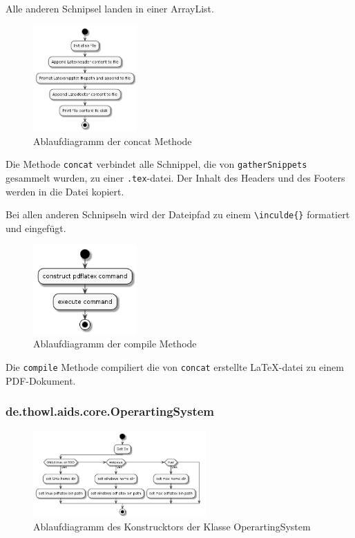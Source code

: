 \documentclass[stu, a4paper, 11pt, floatsintext]{apa7}
\begin{document}
Alle anderen Schnipsel landen in einer ArrayList.

\begin{figure}[!htbp]
\centering
\includegraphics[width=150px]{../technical_documentation/diagramm/uml/flowcharts/core/latex/concat.png}
\caption{\label{concat-methode}Ablaufdiagramm der concat Methode}
\end{figure}

\noindent Die Methode \texttt{concat} verbindet alle Schnippel, die von \texttt{gatherSnippets} gesammelt wurden, zu einer \texttt{.tex}-datei.
Der Inhalt des Headers und des Footers werden in die Datei kopiert.

Bei allen anderen Schnipseln wird der Dateipfad zu einem \texttt{\textbackslash{}inculde\{\}}
formatiert und eingefügt.

\begin{figure}[!htbp]
\centering
\includegraphics[width=150px]{../technical_documentation/diagramm/uml/flowcharts/core/latex/compile.png}
\caption{\label{compile-methode}Ablaufdiagramm der compile Methode}
\end{figure}

\noindent Die \texttt{compile} Methode compiliert die von \texttt{concat} erstellte \LaTeX{}-datei zu einem PDF-Dokument.

\clearpage

\subsubsection{de.thowl.aids.core.OperartingSystem}

\begin{figure}[!htbp]
\centering
\includegraphics[width=250px]{../technical_documentation/diagramm/uml/flowcharts/core/os/construcktor.png}
\caption{\label{os-construcktor}Ablaufdiagramm des Konstrucktors der Klasse OperartingSystem}
\end{figure}
\end{document}
